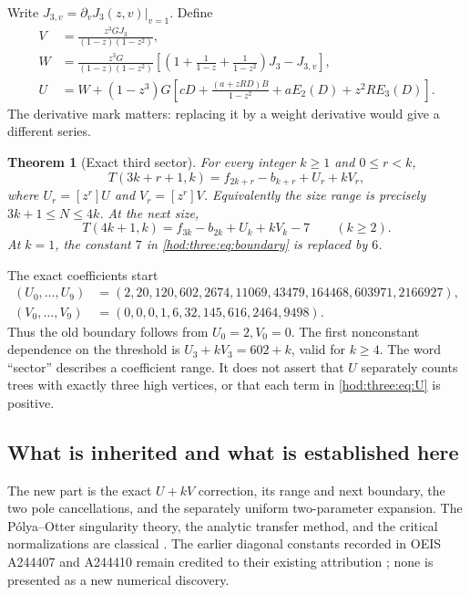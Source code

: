 \documentclass[11pt,letterpaper]{article}
\newtheorem{theorem}{Theorem}[section]
\theoremstyle{definition}\newtheorem{definition}[theorem]{Definition}
\theoremstyle{remark}\newtheorem{remark}[theorem]{Remark}
\begin{document}
Write $J_{3,v}=\partial_vJ_3(z,v)|_{v=1}$. Define
\begin{align}
V&=\frac{z^3GJ_3}{(1-z)(1-z^2)},\label{hod:three:eq:V}\\
W&=\frac{z^3G}{(1-z)(1-z^2)}
\left[\left(1+\frac1{1-z}+\frac1{1-z^2}\right)J_3-J_{3,v}\right],\label{hod:three:eq:W}\\
U&=W+(1-z^3)G\left[cD+
\frac{(a+zRD)B}{1-z^2}+aE_2(D)+z^2R E_3(D)\right].\label{hod:three:eq:U}
\end{align}
The derivative mark matters: replacing it by a weight derivative would give a different series.

\begin{theorem}[Exact third sector]\label{hod:three:thm:third}
For every integer $k\ge1$ and $0\le r<k$,
\begin{equation}\label{hod:three:eq:third}
\boxed{T(3k+r+1,k)=f_{2k+r}-b_{k+r}+U_r+kV_r,}
\end{equation}
where $U_r=[z^r]U$ and $V_r=[z^r]V$. Equivalently the size range is precisely $3k+1\le N\le4k$.
At the next size,
\begin{equation}\label{hod:three:eq:boundary}
T(4k+1,k)=f_{3k}-b_{2k}+U_k+kV_k-7\qquad(k\ge2).
\end{equation}
At $k=1$, the constant $7$ in \eqref{hod:three:eq:boundary} is replaced by $6$.
\end{theorem}
The exact coefficients start
\begin{align*}
(U_0,\ldots,U_9)&=(2,20,120,602,2674,11069,43479,164468,603971,2166927),\\
(V_0,\ldots,V_9)&=(0,0,0,1,6,32,145,616,2464,9498).
\end{align*}
Thus the old boundary follows from $U_0=2,V_0=0$. The first nonconstant dependence on the threshold is $U_3+kV_3=602+k$, valid for $k\ge4$. The word ``sector'' describes a coefficient range. It does not assert that $U$ separately counts trees with exactly three high vertices, or that each term in \eqref{hod:three:eq:U} is positive.

\subsection{What is inherited and what is established here}
The new part is the exact $U+kV$ correction, its range and next boundary, the two pole cancellations, and the separately uniform two-parameter expansion. The P\'olya--Otter singularity theory, the analytic transfer method, and the critical normalizations are classical \cite{otter,schwenk,dg,genitrini,fs}. The earlier diagonal constants recorded in OEIS A244407 and A244410 remain credited to their existing attribution \cite{oeis407,oeis410}; none is presented as a new numerical discovery.
\end{document}
